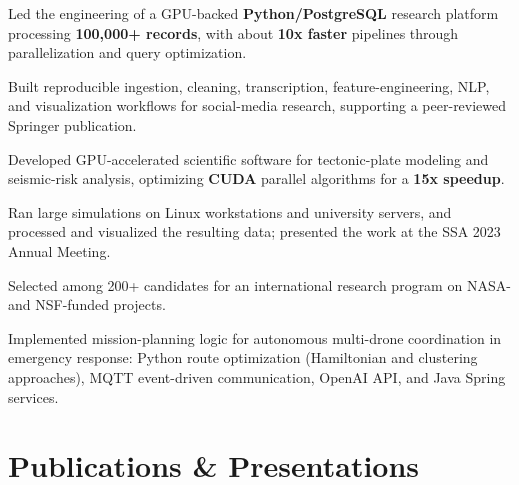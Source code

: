 \documentclass[letterpaper,10pt]{article}
\begin{document}
\begin{points}
  \item Led the engineering of a GPU-backed \textbf{Python/PostgreSQL} research platform processing \textbf{100,000+ records}, with about \textbf{10x faster} pipelines through parallelization and query optimization.
  \item Built reproducible ingestion, cleaning, transcription, feature-engineering, NLP, and visualization workflows for social-media research, supporting a peer-reviewed Springer publication.
\end{points}

\begin{points}
  \item Developed GPU-accelerated scientific software for tectonic-plate modeling and seismic-risk analysis, optimizing \textbf{CUDA} parallel algorithms for a \textbf{15x speedup}.
  \item Ran large simulations on Linux workstations and university servers, and processed and visualized the resulting data; presented the work at the SSA 2023 Annual Meeting.
\end{points}

\begin{points}
  \item Selected among 200+ candidates for an international research program on NASA- and NSF-funded projects.
  \item Implemented mission-planning logic for autonomous multi-drone coordination in emergency response: Python route optimization (Hamiltonian and clustering approaches), MQTT event-driven communication, OpenAI API, and Java Spring services.
\end{points}

\section{Publications \& Presentations}
\end{document}
